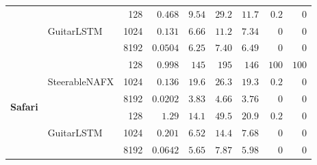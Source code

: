 \begin{table}[htbp]
\begin{tabular}{llrrrrrrr}
   & \multirow{3}{*}{GuitarLSTM} & 128 & $0.468$ & $9.54$ & $29.2$ & $11.7$ & $0.2$ & $0$ \\
   &  & 1024 & $0.131$ & $6.66$ & $11.2$ & $7.34$ & $0$ & $0$ \\
   &  & 8192 & $0.0504$ & $6.25$ & $7.40$ & $6.49$ & $0$ & $0$ \\
\midrule
  \multirow{6}{*}{\textbf{Safari}} & \multirow{3}{*}{SteerableNAFX} & 128 & $0.998$ & $145$ & $195$ & $146$ & $100$ & $100$ \\
   &  & 1024 & $0.136$ & $19.6$ & $26.3$ & $19.3$ & $0.2$ & $0$ \\
   &  & 8192 & $0.0202$ & $3.83$ & $4.66$ & $3.76$ & $0$ & $0$ \\
   & \multirow{3}{*}{GuitarLSTM} & 128 & $1.29$ & $14.1$ & $49.5$ & $20.9$ & $0.2$ & $0$ \\
   &  & 1024 & $0.201$ & $6.52$ & $14.4$ & $7.68$ & $0$ & $0$ \\
   &  & 8192 & $0.0642$ & $5.65$ & $7.87$ & $5.98$ & $0$ & $0$ \\
\bottomrule
\end{tabular}
\end{table}
